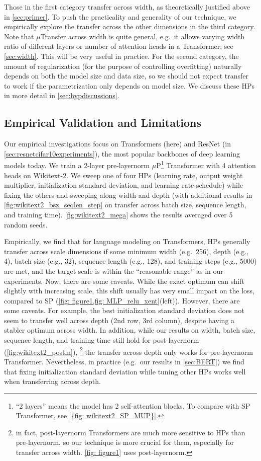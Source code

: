 \documentclass{article}
\theoremstyle{definition}
\begin{document}
Those in the first category transfer across width, as theoretically justified above in \cref{sec:primer}.
To push the practicality and generality of our technique, we empirically explore the transfer across the other dimensions in the third category.
Note that $\mu$Transfer across width is quite general, e.g.\ it allows varying width ratio of different layers or number of attention heads in a Transformer; see \cref{sec:width}.
This will be very useful in practice.
For the second category, the amount of regularization (for the purpose of controlling overfitting) naturally depends on both the model size and data size, so we should not expect transfer to work if the parametrization only depends on model size.
We discuss these HPs in more detail in \cref{sec:hypdiscussions}.

\subsection{Empirical Validation and Limitations}
\label{sec:scienceexperiments}
Our empirical investigations focus on Transformers (here) and ResNet (in \cref{sec:resnetcifar10experiments}), the most popular backbones of deep learning models today.
We train a 2-layer pre-layernorm $\mu$P\footnote{``2 layers'' means the  model has 2 self-attention blocks. To compare with SP Transformer, see \cref{{fig: wikitext2_SP_MUP}}.} Transformer with 4 attention heads on Wikitext-2.
We sweep one of four HPs (learning rate, output weight multiplier, initialization standard deviation, and learning rate schedule) while fixing the others and sweeping along width and depth (with additional results in \cref{fig:wikitext2_bsz_seqlen_step} on transfer across batch size, sequence length, and training time).
\cref{fig:wikitext2_mega} shows the results averaged over 5 random seeds.

Empirically, we find that for language modeling on Transformers, HPs generally transfer across scale dimensions if some minimum width (e.g.\ 256), depth (e.g., 4), batch size (e.g., 32), sequence length (e.g., 128), and training steps (e.g., 5000) are met, and the target scale is within the ``reasonable range'' as in our experiments.
Now, there are some caveats.
While the exact optimum can shift slightly with increasing scale, this shift usually has very small impact on the loss, compared to SP (\cref{fig: figure1,fig: MLP_relu_xent}(left)).
However, there are some caveats.
For example, the best initialization standard deviation does not seem to transfer well across depth (2nd row, 3rd column), despite having a stabler optimum across width.
In addition, while our results on width, batch size, sequence length, and training time still hold for post-layernorm (\cref{fig:wikitext2_postln}),
\footnote{in fact, post-layernorm Transformers are much more sensitive to HPs than pre-layernorm, so our technique is more crucial for them, especially for transfer across width.
\cref{fig: figure1} uses post-layernorm.} the transfer across depth only works for pre-layernorm Transformer.
Nevertheless, in practice (e.g.\ our results in \cref{sec:BERT}) we find that fixing initialization standard deviation while tuning other HPs works well when transferring across depth.
\end{document}
